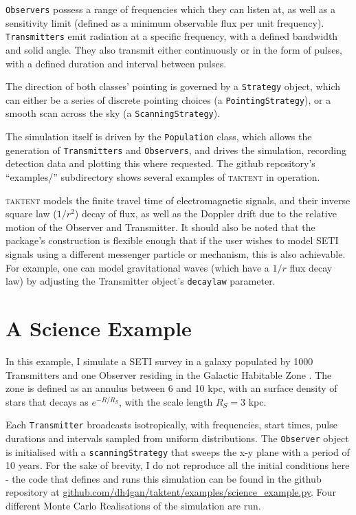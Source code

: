 \documentclass[RNAAS]{aastex62}
\begin{document}
\texttt{Observers} possess a range of frequencies which they can listen at, as well as a sensitivity limit (defined as a minimum observable flux per unit frequency).  \texttt{Transmitters} emit radiation at a specific frequency, with a defined bandwidth and solid angle.  They also transmit either continuously or in the form of pulses, with a defined duration and interval between pulses.

The direction of both classes' pointing is governed by a \texttt{Strategy} object, which can either be a series of discrete pointing choices (a \texttt{PointingStrategy}), or a smooth scan across the sky (a \texttt{ScanningStrategy}).

The simulation itself is driven by the \texttt{Population} class, which allows the generation of \texttt{Transmitters} and \texttt{Observers}, and drives the simulation, recording detection data and plotting this where requested.  The github repository's ``examples/'' subdirectory shows several examples of \textsc{taktent} in operation.

\textsc{taktent} models the finite travel time of electromagnetic signals, and their inverse square law ($1/r^2$) decay of flux, as well as the Doppler drift due to the relative motion of the Observer and Transmitter.  It should also be noted that the package's construction is flexible enough that if the user wishes to model SETI signals using a different messenger particle or mechanism, this is also achievable.  For example, one can model gravitational waves (which have a $1/r$ flux decay law) by adjusting the Transmitter object's \texttt{decaylaw} parameter.

\section{A Science Example}

\noindent In this example, I simulate a SETI survey in a galaxy populated by 1000 Transmitters and one Observer residing in the Galactic Habitable Zone \citep{GHZ,Gowanlock2011}.  The zone is defined as an annulus between 6 and 10 kpc, with an  surface density of stars that decays as $e^{-R/R_S}$, with the scale length $R_S=3$ kpc. 

Each \texttt{Transmitter} broadcasts isotropically, with frequencies, start times, pulse durations and intervals sampled from uniform distributions.  The \texttt{Observer} object is initialised with a \texttt{scanningStrategy} that sweeps the x-y plane with a period of 10 years.  For the sake of brevity, I do not reproduce all the initial conditions here - the code that defines and runs this simulation can be found in the github repository at \url{github.com/dh4gan/taktent/examples/science\_example.py}.  Four different Monte Carlo Realisations of the simulation are run.
\end{document}

